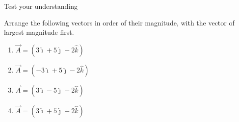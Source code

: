 \documentclass[]{beamer}
\begin{document}
\begin{frame}

Test your understanding


\vspace{3mm}


Arrange the following vectors
in order of their magnitude, with the vector of largest magnitude first.
\vspace{3mm}

\begin{enumerate}
\item $\vec{A}=(3\hat{\imath}+5\hat{\jmath}-2\hat{k})$
\item $\vec{A}=(-3\hat{\imath}+5\hat{\jmath}-2\hat{k})$
\item $\vec{A}=(3\hat{\imath}-5\hat{\jmath}-2\hat{k})$
\item $\vec{A}=(3\hat{\imath}+5\hat{\jmath}+2\hat{k})$
\end{enumerate}

 


 \end{frame}

\end{document}
